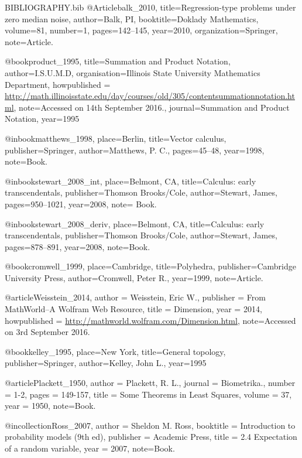  \RequirePackage{filecontents}
\begin{filecontents}{BIBLIOGRAPHY.bib}
@Article{balk_2010,
  title={Regression-type problems under zero median noise},
  author={Balk, PI},
  booktitle={Doklady Mathematics},
  volume={81},
  number={1},
  pages={142--145},
  year={2010},
  organization={Springer},
  note={Article.}}

@book{product_1995, 
 title={Summation and Product Notation},
 author={I.S.U.M.D},
 organisation={Illinois State University Mathematics Department},
 howpublished = {\url{http://math.illinoisstate.edu/day/courses/old/305/contentsummationnotation.html}},
 note={Accessed on 14th September 2016.},
 journal={Summation and Product Notation}, 
 year={1995}}
 
@inbook{matthews_1998, 
 place={Berlin}, 
 title={Vector calculus}, 
 publisher={Springer}, 
 author={Matthews, P. C.}, 
 pages={45--48},
 year={1998},
 note={Book.}}


@inbook{stewart_2008_int, 
 place={Belmont, CA}, 
 title={Calculus: early transcendentals}, 
 publisher={Thomson Brooks/Cole}, 
 author={Stewart, James}, 
 pages={950--1021},
 year={2008},
 note= {Book.}}
 
 @inbook{stewart_2008_deriv, 
 place={Belmont, CA}, 
 title={Calculus: early transcendentals}, 
 publisher={Thomson Brooks/Cole}, 
 author={Stewart, James}, 
 pages={878--891},
 year={2008},
 note={Book.}}
 
@book{cromwell_1999, 
 place={Cambridge}, 
 title={Polyhedra}, 
 publisher={Cambridge University Press}, 
 author={Cromwell, Peter R.}, 
 year={1999},
 note={Article.}}
 
@article{Weisstein_2014,
 author = {Weisstein, Eric W.},
 publisher = {From MathWorld--A Wolfram Web Resource},
 title = {Dimension},
 year = {2014},
 howpublished = {\url{http://mathworld.wolfram.com/Dimension.html}},
 note={Accessed on 3rd September 2016.}}

@book{kelley_1995, 
 place={New York}, 
 title={General topology}, 
 publisher={Springer}, 
 author={Kelley, John L.}, 
 year={1995}}
 
@article{Plackett_1950,
 author = {Plackett, R. L.},
 journal = {Biometrika.},
 number = {1-2},
 pages = {149-157},
 title = {Some Theorems in Least Squares},
 volume = {37},
 year = {1950},
 note={Book.}}

@incollection{Ross_2007,
 author = {Sheldon M. Ross},
 booktitle = {Introduction to probability models (9th ed)},
 publisher = {Academic Press},
 title = {2.4 Expectation of a random variable},
 year = {2007},
 note={Book.}}


\end{filecontents}
